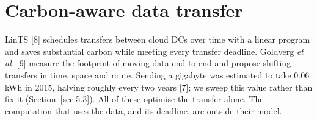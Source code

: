 \documentclass[12pt,a4paper,oneside,openany]{report}
\begin{document}
\section{Carbon-aware data transfer}\label{sec:2.5}

LinTS {[}8{]} schedules transfers between cloud DCs over time with a
linear program and saves substantial carbon while meeting every transfer
deadline. Goldverg \emph{et al.} {[}9{]} measure the footprint of moving
data end to end and propose shifting transfers in time, space and route.
Sending a gigabyte was estimated to take 0.06 kWh in 2015, halving
roughly every two years {[}7{]}; we sweep this value rather than fix it
(Section~\ref{sec:5.3}). All of these optimise the transfer alone. The computation
that uses the data, and its deadline, are outside their model.
\end{document}

